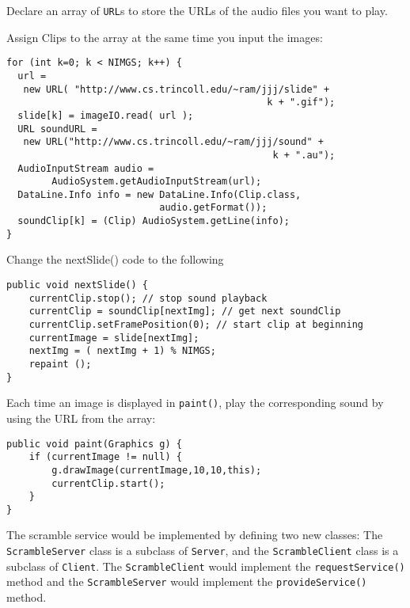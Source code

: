 {{{{\begin{ANS}
\noindent Declare an array of {\tt URL}s to store the URLs of
the audio files you want to play.

\hspace*{1pc}Assign Clips to the array at the same time
you input the images:

\begin{jjjlisting}
\begin{lstlisting}
for (int k=0; k < NIMGS; k++) {
  url = 
   new URL( "http://www.cs.trincoll.edu/~ram/jjj/slide" + 
                                              k + ".gif");
  slide[k] = imageIO.read( url );
  URL soundURL = 
   new URL("http://www.cs.trincoll.edu/~ram/jjj/sound" +
                                               k + ".au");
  AudioInputStream audio =
		AudioSystem.getAudioInputStream(url); 
  DataLine.Info info = new DataLine.Info(Clip.class, 
						   audio.getFormat()); 
  soundClip[k] = (Clip) AudioSystem.getLine(info);
}
\end{lstlisting}
\end{jjjlisting}

\noindent Change the nextSlide() code to the following

\begin{jjjlisting}
\begin{lstlisting}
public void nextSlide() {
    currentClip.stop(); // stop sound playback
    currentClip = soundClip[nextImg]; // get next soundClip
    currentClip.setFramePosition(0); // start clip at beginning
    currentImage = slide[nextImg]; 
    nextImg = ( nextImg + 1) % NIMGS; 
    repaint ();
}
\end{lstlisting}
\end{jjjlisting}

\noindent Each time an image is displayed in {\tt paint()}, play
the corresponding sound by using the URL from the array:

\begin{jjjlisting}
\begin{lstlisting}
public void paint(Graphics g) {
    if (currentImage != null) {
        g.drawImage(currentImage,10,10,this);
        currentClip.start();
    }
}
\end{lstlisting}
\end{jjjlisting}

\item  The scramble service would be implemented by defining
two new classes: The {\tt ScrambleServer} class is a
subclass of {\tt Server}, and the {\tt ScrambleClient} class
is a subclass of {\tt Client}.
The {\tt ScrambleClient} would implement the {\tt requestService()}
method and the {\tt ScrambleServer} would implement the
{\tt provideService()} method.


\end{ANS}}}}}
